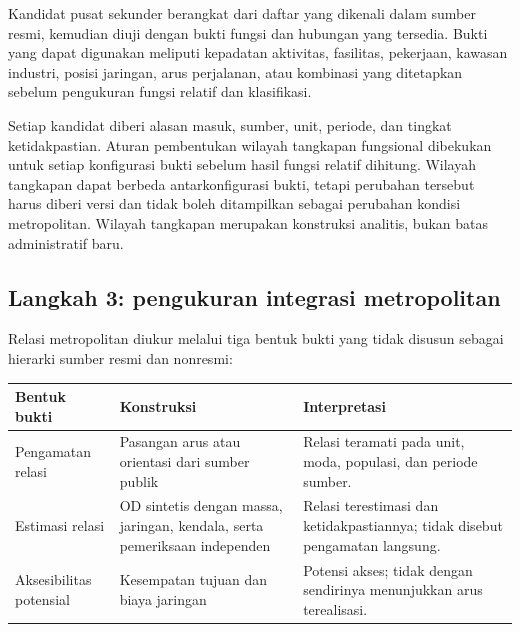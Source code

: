 \documentclass[11pt,a4paper,oneside,openany,indonesian]{report}
\begin{document}
Kandidat pusat sekunder berangkat dari daftar yang dikenali dalam sumber
resmi, kemudian diuji dengan bukti fungsi dan hubungan yang tersedia.
Bukti yang dapat digunakan meliputi kepadatan aktivitas, fasilitas,
pekerjaan, kawasan industri, posisi jaringan, arus perjalanan, atau
kombinasi yang ditetapkan sebelum pengukuran fungsi relatif dan
klasifikasi.

Setiap kandidat diberi alasan masuk, sumber, unit, periode, dan tingkat
ketidakpastian. Aturan pembentukan wilayah tangkapan fungsional
dibekukan untuk setiap konfigurasi bukti sebelum hasil fungsi relatif
dihitung. Wilayah tangkapan dapat berbeda antarkonfigurasi bukti, tetapi
perubahan tersebut harus diberi versi dan tidak boleh ditampilkan
sebagai perubahan kondisi metropolitan. Wilayah tangkapan merupakan
konstruksi analitis, bukan batas administratif baru.

\subsection{Langkah 3: pengukuran integrasi
metropolitan}\label{langkah-3-pengukuran-integrasi-metropolitan}

Relasi metropolitan diukur melalui tiga bentuk bukti yang tidak disusun
sebagai hierarki sumber resmi dan nonresmi:

{\def\LTcaptype{none} %
\begin{longtable}[]{@{}
  >{\raggedright\arraybackslash}p{}
  >{\raggedright\arraybackslash}p{}
  >{\raggedright\arraybackslash}p{}@{}}
\toprule\noalign{}
\begin{minipage}[b]{\linewidth}\raggedright
Bentuk bukti
\end{minipage} & \begin{minipage}[b]{\linewidth}\raggedright
Konstruksi
\end{minipage} & \begin{minipage}[b]{\linewidth}\raggedright
Interpretasi
\end{minipage} \\
\midrule\noalign{}
\endhead
\bottomrule\noalign{}
\endlastfoot
Pengamatan relasi & Pasangan arus atau orientasi dari sumber publik &
Relasi teramati pada unit, moda, populasi, dan periode sumber. \\
Estimasi relasi & OD sintetis dengan massa, jaringan, kendala, serta
pemeriksaan independen & Relasi terestimasi dan ketidakpastiannya; tidak
disebut pengamatan langsung. \\
Aksesibilitas potensial & Kesempatan tujuan dan biaya jaringan & Potensi
akses; tidak dengan sendirinya menunjukkan arus terealisasi. \\
\end{longtable}
}
\end{document}
